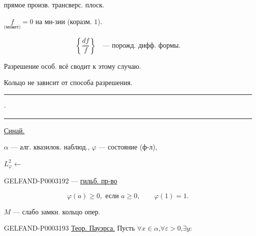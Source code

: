 прямое произв. трансверс. плоск.

$\underset{\text{(может)}}{f}=0$ на мн-зии (коразм. $1$).

\begin{equation*}\left\{\frac{df}{f}\right\}\quad\text{--- порожд. дифф. формы.}\end{equation*}

Разрешение особ. всё сводит к этому случаю.

Кольцо не зависит от способа разрешения.

\begin{center}\rule{20mm}{.6pt}\quad$\cdot$\quad\rule{20mm}{.6pt}\end{center}

\uline{\uline{Синай.}}

$\alpha$ --- алг. квазилок. наблюд., $\varphi$ --- состояние (ф-л),

$L_\varphi^2\longleftarrow$

\begin{GelfandAdjacentEvidence}{GELFAND-P000319}{2}
--- \uline{\uline{гильб. пр-во}}

\end{GelfandAdjacentEvidence}


\begin{equation*}\varphi(a)\ge0,\text{ если }a\ge0,\qquad\varphi(1)=1.\end{equation*}

$M$ --- слабо замкн. кольцо опер.

\begin{GelfandAdjacentEvidence}{GELFAND-P000319}{3}
\uline{Теор. Пауэрса.} Пусть $\forall x\in\alpha$,\quad$\forall\varepsilon>0$,\quad$\exists y$:

\end{GelfandAdjacentEvidence}


